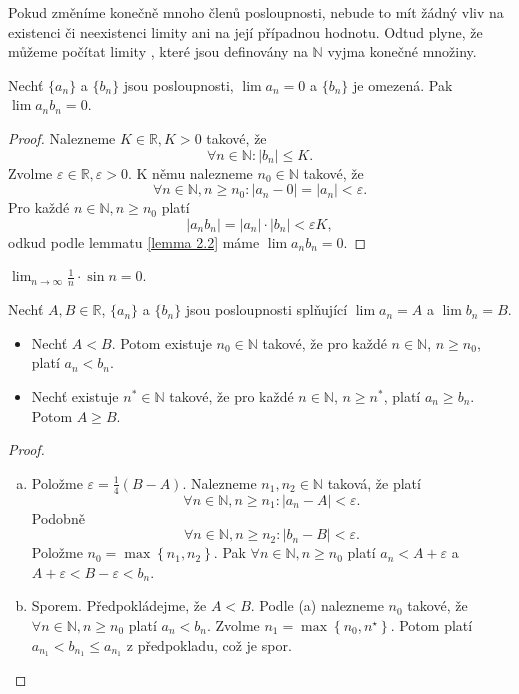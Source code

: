 \begin{poznamka}
	Pokud změníme konečně mnoho členů posloupnosti, nebude to mít žádný vliv na existenci či neexistenci limity ani na její
	případnou hodnotu. Odtud plyne, že můžeme počítat limity , které jsou definovány na $\mathbb N $
	vyjma konečné množiny.
\end{poznamka}

\begin{veta}\label{veta2.7}
Nechť $\{a_n\}$ a $\{b_n\}$ jsou posloupnosti, $\lim a_n = 0$ a $\{b_n\}$ je omezená.
Pak $\lim a_n b_n = 0.$
\end{veta}

\begin{proof}
	Nalezneme $K \in \mathbb R , K > 0$ takové, že
	$$
	    \forall n \in \mathbb N : |b_n| \leq K.
	$$
	Zvolme $\varepsilon \in \mathbb R , \varepsilon > 0$. K němu nalezneme $n_0 \in \mathbb N $ takové, že
	$$
	    \forall n \in \mathbb N , n \geq n_0: |a_n - 0| = |a_n|< \varepsilon.
	$$
	Pro každé $n \in \mathbb N , n \geq n_0$ platí
	$$
	    |a_nb_n| = |a_n|\cdot |b_n| < \varepsilon K,
	$$
	odkud podle lemmatu \ref{lemma 2.2} máme $\lim a_nb_n = 0$.
\end{proof}

\begin{priklad}
	$\lim_{n \to \infty} \frac{1}{n}\cdot \sin n = 0.$
\end{priklad}

\begin{veta} \label{veta2.8}
Nechť $A, B \in \mathbb{R}$, $\{a_n\}$ a $\{b_n\}$ jsou posloupnosti splňující
$\lim a_n = A$ a $\lim b_n = B$.
\begin{itemize}
  \item[(a)] Nechť $A < B$. Potom existuje $n_0 \in \mathbb{N}$ takové, že pro každé
  $n \in \mathbb{N}$, $n \ge n_0$, platí $a_n < b_n$.
  \item[(b)] Nechť existuje $n^\ast \in \mathbb{N}$ takové, že pro každé
  $n \in \mathbb{N}$, $n \ge n^\ast$, platí $a_n \ge b_n$. Potom $A \ge B$.
\end{itemize}
\end{veta}

\begin{proof}
	\,
	\begin{enumerate}[(a)]
		\item Položme $\varepsilon = \frac{1}{4} (B-A)$. Nalezneme $n_1,n_2\in \mathbb N $ taková, že
		platí
		$$
		    \forall n \in \mathbb N , n \geq n_1: |a_n - A| < \varepsilon.
		$$
		Podobně
		$$
		    \forall n \in \mathbb N , n \geq n_2: |b_n-B|<\varepsilon.
		$$
		Položme $n_0=\max \left \{ n_1,n_2 \right \} $. Pak $\forall n \in \mathbb N , n \geq n_0$ platí
		$a_n < A+\varepsilon$ a $A+\varepsilon < B-\varepsilon<b_n$.
		\item Sporem. Předpokládejme, že $A<B$. Podle (a) nalezneme $n_0$ takové, že $\forall n \in \mathbb N , n \geq n_0$
		platí $a_n < b_n$. Zvolme $n_1 = \max \left \{ n_0, n^\star \right \} $. Potom platí $a_{n_1}<b_{n_1}\leq a_{n_1}$
		z předpokladu, což je spor.\qedhere
	\end{enumerate}
\end{proof}


